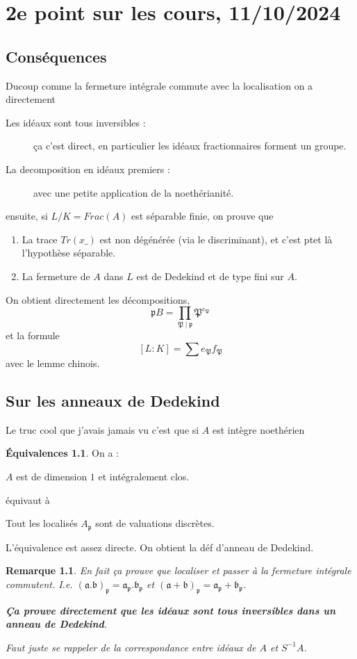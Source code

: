 \documentclass[a4paper,12pt]{book}
\renewcommand{\b}{\mathfrak b}
\renewcommand{\a}{\mathfrak a}
\newcommand{\p}{\mathfrak p}
\theoremstyle{plain}
\newtheorem{rem}{Remarque}
\theoremstyle{definition}
\newtheorem*{eq}{Équivalences}
\theoremstyle{remark}
\begin{document}
\chapter{2e point sur les cours, 11/10/2024}

\section{Conséquences}
Ducoup comme la fermeture intégrale commute avec la localisation on
a directement 
\begin{description}
    \item[Les idéaux sont tous inversibles :] ça c'est direct, en 
	particulier les idéaux fractionnaires forment un groupe.
    \item[La decomposition en idéaux premiers :] avec une petite 
	application de la noethérianité.
\end{description}
ensuite, si $L/K=Frac(A)$ est séparable finie, on prouve que 
\begin{enumerate}
    \item La trace $Tr(x\_)$ est non dégénérée (via le discriminant),
	et c'est ptet là l'hypothèse séparable.
    \item La fermeture de $A$ dans $L$ est de Dedekind et de type fini 
	sur $A$.
\end{enumerate}
On obtient directement les décompositions, 
\[\p B=\prod_{\mathfrak P\mid \p} \mathfrak P^{e_{\mathfrak P}}\]
et la formule 
\[[L:K]=\sum e_{\mathfrak P}f_{\mathfrak P}\]
avec le lemme chinois.


\section{Sur les anneaux de Dedekind}
Le truc cool que j'avais jamais vu c'est que si $A$ est intègre 
noethérien
\begin{eq}
    On a :
    \begin{center}
	$A$ est de dimension $1$ et intégralement clos.
    \end{center}
    équivaut à
    \begin{center}
	Tout les localisés $A_{\p}$ sont de valuations discrètes.
    \end{center}
\end{eq}
L'équivalence est assez directe. On obtient la déf d'anneau de Dedekind.
\begin{rem}
    En fait ça prouve que localiser et passer à la fermeture intégrale
    commutent. I.e. $(\a.\b)_{\p}=\a_{\p}.\b_{\p}$ et 
    $(\a+\b)_{\p}=\a_{\p}+\b_{\p}$.
    \begin{center}
	\textbf{Ça prouve directement que 
	les idéaux sont tous inversibles dans un anneau de Dedekind}.
    \end{center}
    Faut juste se rappeler de la correspondance entre idéaux de 
    $A$ et $S^{-1}A$.
\end{rem}
\end{document}
